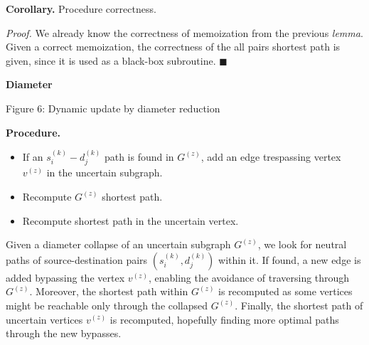 \textbf{Corollary.} Procedure correctness.

\textit{Proof.} We already know the correctness of memoization from the previous \textit{lemma}. Given a correct memoization, the correctness of the all pairs shortest path is given, since it is used as a black-box subroutine. $\blacksquare$


\textbf{Diameter}

\begin{center}
    
    Figure 6: Dynamic update by diameter reduction
\end{center}

\textbf{Procedure.}
\begin{itemize}
    \item If an $s_i^{(k)}-d_j^{(k)}$ path is found in $G^{(z)}$, add an edge trespassing vertex $v^{(z)}$ in the uncertain subgraph.
    \item Recompute $G^{(z)}$ shortest path.
    \item Recompute shortest path in the uncertain vertex.
\end{itemize}

Given a diameter collapse of an uncertain subgraph $G^{(z)}$, we look for neutral paths of source-destination pairs $(s_i^{(k)}, d_j^{(k)})$ within it. If found, a new edge is added bypassing the vertex $v^{(z)}$, enabling the avoidance of traversing through $G^{(z)}$. Moreover, the shortest path within $G^{(z)}$ is recomputed as some vertices might be reachable only through the collapsed $G^{(z)}$. Finally, the shortest path of uncertain vertices $v^{(z)}$ is recomputed, hopefully finding more optimal paths through the new bypasses.
